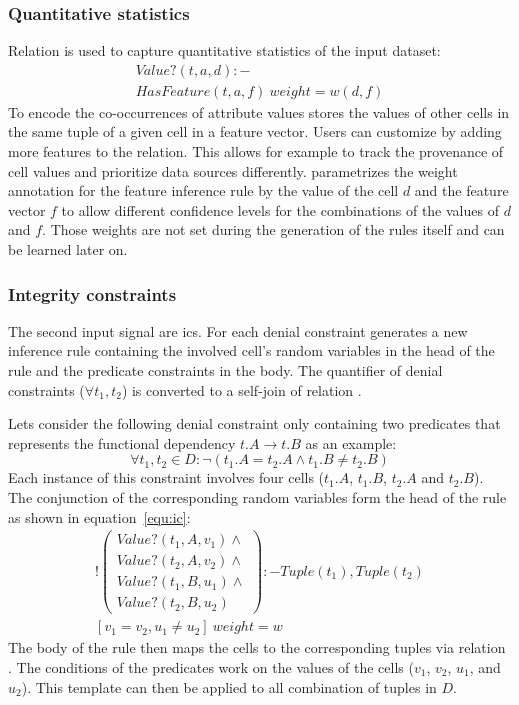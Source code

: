   \subsubsection*{Quantitative statistics}
  Relation  is used to capture quantitative statistics of the input dataset:
  \begin{multline}
    Value?(t,a,d):-\\HasFeature(t,a,f)\ weight=w(d,f)\label{equ:statistics}
  \end{multline}
  To encode the co-occurrences of attribute values  stores the values of other cells in the same tuple of a given cell in a feature vector.
  Users can customize \holoclean{} by adding more features to the  relation.
  This allows for example to track the provenance of cell values and prioritize data sources differently.
  \holoclean{} parametrizes the weight annotation for the feature inference rule by the value of the cell $d$ and the feature vector $f$ to allow different confidence levels for the combinations of the values of $d$ and $f$.
  Those weights are not set during the generation of the rules itself and can be learned later on.
  
  \subsubsection*{Integrity constraints}
  The second input signal are \glspl{ic}.
  For each denial constraint \holoclean{} generates a new inference rule containing the involved cell's random variables in the head of the rule and the predicate constraints in the body.
  The quantifier of denial constraints ($\forall t_1, t_2$) is converted to a self-join of relation .
  
  Lets consider the following denial constraint only containing two predicates that represents the functional dependency $t.A \to t.B$ as an example:
  \begin{equation}
    \forall t_1, t_2 \in D: \neg(t_1.A = t_2.A \land t_1.B \neq t_2.B)
  \end{equation}
  Each instance of this constraint involves four cells ($t_1.A$, $t_1.B$, $t_2.A$ and $t_2.B$).
  The conjunction of the corresponding random variables form the head of the \ddlog{} rule as shown in equation~\ref{equ:ic}:
  \begin{multline}
    !
    \begin{pmatrix}
      Value?(t_1,A,v_1) \land\\
      Value?(t_2,A,v_2) \land\\
      Value?(t_1,B,u_1) \land\\
      Value?(t_2,B,u_2)
    \end{pmatrix}
    :- Tuple(t_1),Tuple(t_2)\\
    [v_1 = v_2, u_1 \neq u_2]\ weight=w\label{equ:ic}
  \end{multline}
  The body of the rule then maps the cells to the corresponding tuples via relation .
  The conditions of the predicates work on the values of the cells ($v_1$, $v_2$, $u_1$, and $u_2$).
  This template can then be applied to all combination of tuples in $D$.
  
